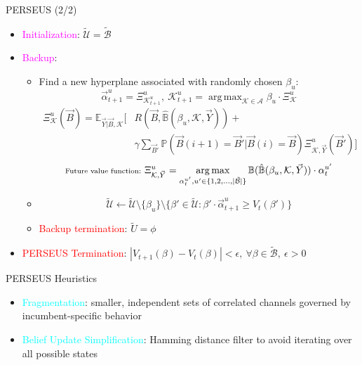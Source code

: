 \documentclass{beamer}
\DeclareMathOperator*{\argmax}{arg\,max}
\begin{document}
\begin{frame}{PERSEUS (2/2)}
    \begin{itemize}
        \item \textcolor{magenta}{Initialization}: $\tilde{\mathcal{U}}{=}\tilde{\mathcal{B}}$
        \item \textcolor{magenta}{Backup}: 
        \begin{itemize}
            \item Find a new hyperplane associated with randomly chosen $\beta_{u}$:
            \[\vec{\alpha}_{t+1}^{u}=\Xi_{\mathcal K_{t+1}^{u}}^{u},\ \mathcal K_{t+1}^{u}=\argmax_{\mathcal{K} \in \mathcal{A}} \beta_u \cdot \Xi_{\mathcal{K}}^{u}\]
            \begin{align*}
                \Xi_{\mathcal{K}}^{u}(\vec{B}) = \mathbb{E}_{\vec{Y}|\vec{B}, \mathcal{K}} \Big[&R(\vec{B}, \hat{\mathbb{B}}(\beta_{u}, \mathcal{K}, \vec{Y}))+\\&\gamma \sum_{\vec{B}'}\mathbb{P}(\vec{B}(i+1){=} \vec{B}'|\vec{B}(i){=}\vec{B})\Xi_{\mathcal{K}, \vec{Y}}^{u}(\vec{B}')\Big]
            \end{align*}
            \[\scriptsize{\text{Future value function: }}\Xi_{\mathcal{K}, \vec{Y}}^{u}=\argmax_{\alpha_{t}^{u'}, u' {\in} \{1, 2, \dots, |\tilde{\mathcal{B}}|\}} \mathbb{B}(\hat{\mathbb{B}}(\beta_{u}, \mathcal{K}, \vec{Y}))\cdot\alpha_{t}^{u'}\]
            \item $$
                    \tilde{\mathcal{U}}\leftarrow \tilde{\mathcal{U}}\setminus\{\beta_u\}\setminus
                    \{\beta'\in\tilde{\mathcal{U}}:\beta'{\cdot}\vec{\alpha}_{t+1}^{u}\geq V_t(\beta')\}
                 $$
            \item \textcolor{red}{Backup termination}: $\tilde{U}{=}\phi$
        \end{itemize}
        \item \textcolor{red}{PERSEUS Termination}: $|V_{t{+}1}(\beta){-}V_{t}(\beta)|{<}\epsilon,\ \forall \beta{\in} \tilde{\mathcal{B}},\ \epsilon{>}0$
    \end{itemize}
\end{frame}
\begin{frame}{PERSEUS Heuristics}
    \begin{itemize}
        \item \textcolor{cyan}{Fragmentation}: smaller, independent sets of correlated channels governed by incumbent-specific behavior
        \item \textcolor{cyan}{Belief Update Simplification}: Hamming distance filter to avoid iterating over all possible states
    \end{itemize}
\end{frame}
\end{document}
